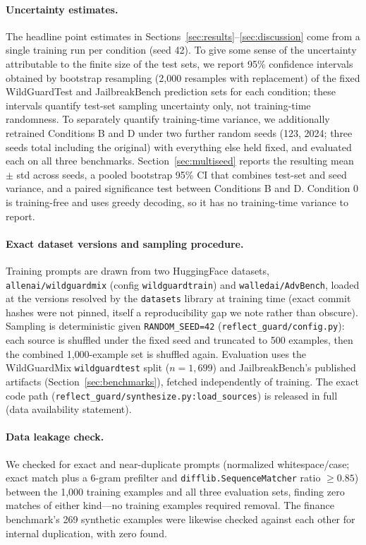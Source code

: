 \documentclass[Superintelligence,article,submit,pdftex,moreauthors]{Definitions/mdpi}
\begin{document}
\paragraph{Uncertainty estimates.} The headline point estimates in Sections~\ref{sec:results}--\ref{sec:discussion} come from a single training run per condition (seed 42). To give some sense of the uncertainty attributable to the finite size of the test sets, we report 95\% confidence intervals obtained by bootstrap resampling (2{,}000 resamples with replacement) of the fixed WildGuardTest and JailbreakBench prediction sets for each condition; these intervals quantify test-set sampling uncertainty only, not training-time randomness. To separately quantify training-time variance, we additionally retrained Conditions B and D under two further random seeds (123, 2024; three seeds total including the original) with everything else held fixed, and evaluated each on all three benchmarks. Section~\ref{sec:multiseed} reports the resulting mean $\pm$ std across seeds, a pooled bootstrap 95\% CI that combines test-set and seed variance, and a paired significance test between Conditions B and D. Condition 0 is training-free and uses greedy decoding, so it has no training-time variance to report.

\paragraph{Exact dataset versions and sampling procedure.} Training prompts are drawn from two HuggingFace datasets, \texttt{allenai/wildguardmix} (config \texttt{wildguardtrain}) and \texttt{walledai/AdvBench}, loaded at the versions resolved by the \texttt{datasets} library at training time (exact commit hashes were not pinned, itself a reproducibility gap we note rather than obscure). Sampling is deterministic given \texttt{RANDOM\_SEED=42} (\texttt{reflect\_guard/config.py}): each source is shuffled under the fixed seed and truncated to 500 examples, then the combined 1{,}000-example set is shuffled again. Evaluation uses the WildGuardMix \texttt{wildguardtest} split ($n=1{,}699$) and JailbreakBench's published artifacts (Section~\ref{sec:benchmarks}), fetched independently of training. The exact code path (\texttt{reflect\_guard/synthesize.py:load\_sources}) is released in full (data availability statement).

\paragraph{Data leakage check.} We checked for exact and near-duplicate prompts (normalized whitespace/case; exact match plus a 6-gram prefilter and \texttt{difflib.SequenceMatcher} ratio $\geq 0.85$) between the 1{,}000 training examples and all three evaluation sets, finding zero matches of either kind---no training examples required removal. The finance benchmark's 269 synthetic examples were likewise checked against each other for internal duplication, with zero found.
\end{document}
